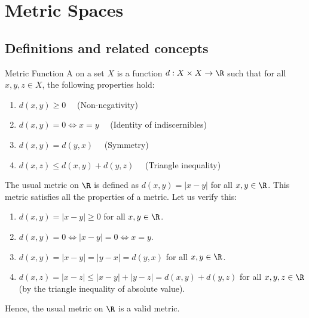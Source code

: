 \documentclass[openany]{book}
\begin{document}
\section{Metric Spaces}
\subsection{Definitions and related concepts}
\begin{mydefinition}{Metric Function}
    A  on a set $X$ is a function $d: X \times X \rightarrow \R$ such that for all $x, y, z \in X$, the following properties hold:
    \begin{enumerate}
        \item $d(x, y) \geq 0 \quad$ (Non-negativity)
        \item $d(x, y) = 0 \iff x = y \quad$ (Identity of indiscernibles)
        \item $d(x, y) = d(y, x) \quad$ (Symmetry)
        \item $d(x, z) \leq d(x, y) + d(y, z) \quad$ (Triangle inequality)
    \end{enumerate}
\end{mydefinition}
\begin{example}
    The usual metric on $\R$ is defined as $d(x, y) = |x - y|$ for all $x, y \in \R$. This metric satisfies all the properties of a metric. Let us verify this:
    \begin{enumerate}
        \item $d(x, y) = |x - y| \geq 0$ for all $x, y \in \R$.
        \item $d(x, y) = 0 \iff |x - y| = 0 \iff x = y$.
        \item $d(x, y) = |x - y| = |y - x| = d(y, x)$ for all $x, y \in \R$.
        \item $d(x, z) = |x - z| \leq |x - y| + |y - z| = d(x, y) + d(y, z)$ for all $x, y, z \in \R$ (by the triangle inequality of absolute value).
    \end{enumerate}
    Hence, the usual metric on $\R$ is a valid metric.
\end{example}
\end{document}
